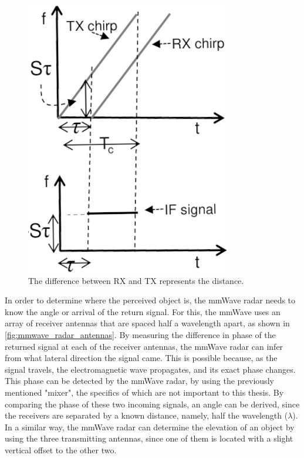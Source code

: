 \begin{figure}[h]
\begin{minipage}[c]{0.4\textwidth}
        \includegraphics[width=\linewidth]{figures/mmwave/mmwave_IF_signal_cropped.png}
        \caption{The difference between RX and TX represents the distance. \cite{introduction_to_mmwave}}
        \label{fig:mmwave_if_signal}
    \end{minipage}%
\end{figure}


In order to determine where the perceived object is, the mmWave radar needs to know the angle or arrival of the return signal.
For this, the mmWave uses an array of receiver antennas that are spaced half a wavelength apart, as shown in \cref{fig:mmwave_radar_antennas}. 
By measuring the difference in phase of the returned signal at each of the receiver antennas, the mmWave radar can infer from what lateral direction the signal came.
This is possible because, as the signal travels, the electromagnetic wave propagates, and its exact phase changes.
This phase can be detected by the mmWave radar, by using the previously mentioned "mixer", the specifics of which are not important to this thesis.
By comparing the phase of these two incoming signals, an angle can be derived, since the receivers are separated by a known distance, namely, half the wavelength ($\lambda$).
In a similar way, the mmWave radar can determine the elevation of an object by using the three transmitting antennas, since one of them is located with a slight vertical offset to the other two.

